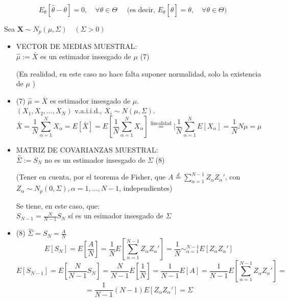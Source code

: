 \documentclass[11pt,a4paper]{article}
\begin{document}
$$E_{\theta}[\hat{\theta}-\theta]=0, \quad \forall \theta \in \Theta \quad \text { (es decir, } E_{\theta}[\hat{\theta}]=\theta, \quad \forall \theta \in \Theta)$$

Sea $\mathbf{X} \sim N_{p}(\mu, \Sigma) \quad(\Sigma>0)$

\begin{itemize}
\item VECTOR DE MEDIAS MUESTRAL: \\
$\hat{\mu}:=\bar{X}$ es un estimador insesgado de $\mu$ (7)

(En realidad, en este caso no hace falta suponer normalidad, solo la existencia de $\mu$ )

\item (7) $\hat{\mu} = \bar{X}$ es estimador insesgado de $\mu$. \\
$(X_{1}, X_{2}, \dots, X_{N})$ v.a.i.i.d., $X_{i} \sim N(\mu, \Sigma)$.
$$\bar{X} = \frac{1}{N} \sum_{\alpha=1}^{N} X_{\alpha} = E[\bar{X}] = E[\frac{1}{N} \sum_{\alpha=1}^{N} X_{\alpha}] \overset{\text{linealidad}}{=} |\frac{1}{N} \sum_{\alpha=1}^{N} E[X_{\alpha}] = \frac{1}{N} N\mu = \mu$$

\item MATRIZ DE COVARIANZAS MUESTRAL: \\
$\hat{\Sigma}:=S_{N}$ no es un estimador insesgado de $\Sigma$ (8)

(Tener en cuenta, por el teorema de Fisher, que $A \stackrel{d}{=} \sum_{\alpha=1}^{N-1} Z_{\alpha} Z_{\alpha}'$, con $Z_{\alpha} \sim N_{p}(0, \Sigma), \alpha=1, \ldots, N-1$, independientes)

Se tiene, en este caso, que: \\
$S_{N-1}=\frac{N}{N-1} S_{N}$ sí es un esimador insesgado de $\Sigma$

\item (8) $\hat{\Sigma} = S_{N} = \frac{A}{N}$
$$E[S_{N}] = E[\frac{A}{N}] = \frac{1}{N}E[\sum_{\alpha=1}^{N-1} Z_{\alpha}Z_{\alpha}'] = \frac{1}{N} \sim_{\alpha=1}^{N-1} E[Z_{\alpha}Z_{\alpha}']$$
$$E[S_{N-1}] = E[\frac{N}{N-1}S_{N}] = \frac{N}{N-1} E[\frac{1}{N}] = \frac{1}{N-1}E[A] = \frac{1}{N-1} E[\sum_{\alpha=1}^{N-1} Z_{\alpha}Z_{\alpha}'] =$$ $$= \frac{1}{N-1}(N-1)E[Z_{\alpha}Z_{\alpha}'] = \Sigma$$
\end{itemize}
\end{document}
